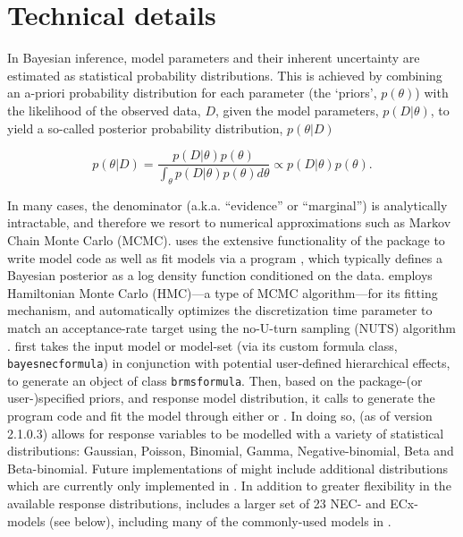 \documentclass[
  shortnames]{jss}
\begin{document}
\hypertarget{technical-details}{%
\section{Technical details}\label{technical-details}}

In Bayesian inference, model parameters and their inherent uncertainty are estimated as statistical probability distributions. This is achieved by combining an a-priori probability distribution for each parameter (the `priors', \(p(\theta)\)) with the likelihood of the observed data, \(D\), given the model parameters, \(p(D | \theta)\), to yield a so-called posterior probability distribution, \(p(\theta | D)\)

\begin{equation}
  p(\theta | D) = \frac{p(D | \theta) p(\theta)}{\int_{\theta} p(D | \theta) p(\theta) d \theta} \propto p(D | \theta) p(\theta).
  \label{eqn1}
\end{equation}

In many cases, the denominator (a.k.a. ``evidence'' or ``marginal'') is analytically intractable, and therefore we resort to numerical approximations such as Markov Chain Monte Carlo (MCMC).  uses the extensive functionality of the  package to write model code as well as fit models via a  program \citep{stan2021}, which typically defines a Bayesian posterior as a log density function conditioned on the data.  employs Hamiltonian Monte Carlo (HMC)---a type of MCMC algorithm---for its fitting mechanism, and automatically optimizes the discretization time parameter to match an acceptance-rate target using the no-U-turn sampling (NUTS) algorithm \citep{hoffman2014}.  first takes the input model or model-set (via its custom formula class, \texttt{bayesnecformula}) in conjunction with potential user-defined hierarchical effects, to generate an object of class \texttt{brmsformula}. Then, based on the package-(or user-)specified priors, and response model distribution, it calls  \citep{Burkner2017, Burkner2018} to generate the  program code and fit the model through either  \citep{rstan2021} or \citep{cmdstanr2022}. In doing so,  (as of version 2.1.0.3) allows for response variables to be modelled with a variety of statistical distributions: Gaussian, Poisson, Binomial, Gamma, Negative-binomial, Beta and Beta-binomial. Future implementations of  might include additional distributions which are currently only implemented in . In addition to greater flexibility in the available response distributions,  includes a larger set of 23 NEC- and ECx- models (see below), including many of the commonly-used models in  \citep{Ritz2016}.
\end{document}
